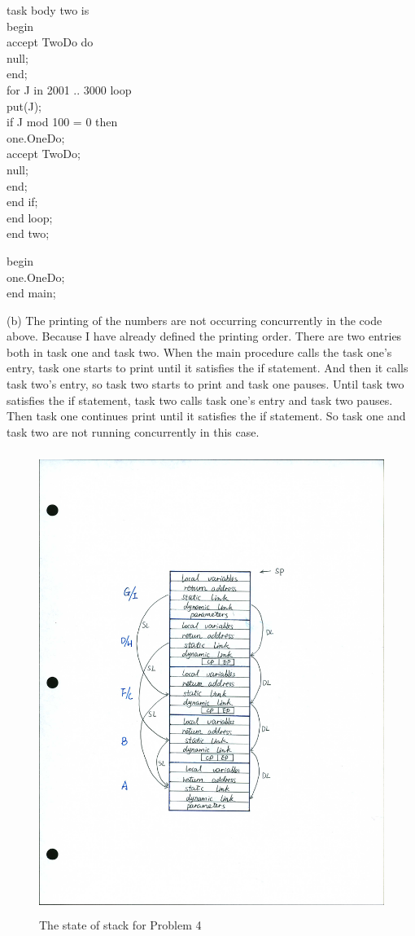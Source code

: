 \documentclass[11pt]{article}
\begin{document}
task body two is\\
begin\\
\qquad accept TwoDo do\\
\qquad \qquad null;\\
\qquad end;\\
	\qquad for J in 2001 .. 3000 loop\\
			\qquad \qquad put(J);\\
			\qquad \qquad if J mod 100 = 0 then\\
			\qquad \qquad \qquad	one.OneDo;\\
			\qquad \qquad \qquad accept TwoDo;\\
			\qquad \qquad \qquad \qquad null;\\
			\qquad \qquad \qquad end;\\
			\qquad \qquad end if;\\
	\qquad end loop;\\
end two;


begin\\
one.OneDo;\\
end main;


(b) The printing  of the numbers are not  occurring concurrently in the code above. Because I have already defined the printing order. There are two entries both in task one and task two. When the main procedure calls the task one's entry, task one starts to print until it satisfies the if statement. And then it calls task two's entry, so task two starts to print and task one pauses. Until task two satisfies the if statement, task two calls task one's entry and task two pauses. Then task one continues print until it satisfies the if statement. So task one and task two are not running concurrently in this case.  



\begin{figure}[t]
\caption{The state of stack for Problem 4}
\includegraphics[width=15cm, height=15cm]{stack}
\centering
\end{figure}
\end{document}
